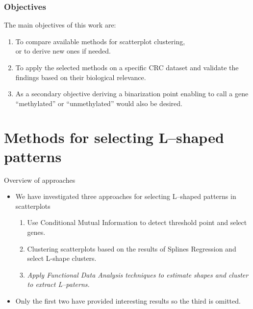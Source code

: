 \documentclass[handout]{beamer}
\begin{document}
\begin{frame}[fragile]\frametitle{Objectives}
The main objectives of this work are:
\begin{enumerate}
\item To compare available methods  for scatterplot clustering, \\ or to derive new ones if needed.
\item To apply the selected methods on a specific CRC dataset and validate the findings based on their biological relevance.
\item As a secondary objective deriving a binarization point enabling to call a gene ``methylated'' or ``unmethylated'' would also be desired.
\end{enumerate} 

\end{frame}

\section{Methods for selecting L--shaped patterns}

\begin{frame}{Overview of approaches}
\begin{itemize}
\item We have investigated three approaches for selecting L--shaped patterns in scatterplots
\begin{enumerate}
\item Use Conditional Mutual Information to detect threshold point and select genes.
\item Clustering scatterplots based on the results of Splines Regression and select L-shape clusters.
\item \emph{Apply Functional Data Analysis techniques to estimate shapes and cluster to extract L--paterns.}
\end{enumerate}
\item Only the first two have provided interesting results so the third is omitted.
\end{itemize}
\end{frame}
\end{document}

